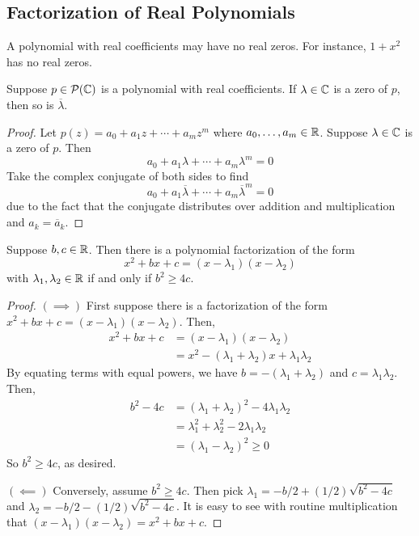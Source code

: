 \subsection*{Factorization of Real Polynomials}
A polynomial with real coefficients may have no real zeros. For instance, $1+x^2$ has no real zeros.
\begin{theorem}
    Suppose $p\in\mathcal{P}(\mathbb{C})$ is a polynomial with real coefficients. If $\lambda\in\mathbb{C}$ is a zero of $p$, then so is $\overline\lambda$.
\end{theorem}
\begin{proof}
    Let $p(z) = a_0 + a_1z + \cdots + a_mz^m$ where $a_0, \dots, a_m \in \mathbb{R}$. Suppose $\lambda\in\mathbb{C}$ is a zero of $p$. Then
    \[ a_0+a_1\lambda + \cdots + a_m\lambda^m = 0 \]
    Take the complex conjugate of both sides to find
    \[ a_0 + a_1\overline \lambda + \cdots + a_m\overline \lambda^m = 0\]
    due to the fact that the conjugate distributes over addition and multiplication and $a_k = \overline a_k$.
\end{proof}
\begin{theorem}
    Suppose $b,c\in\mathbb{R}$. Then there is a polynomial factorization of the form
    \[ x^2+bx+c = (x-\lambda_1)(x-\lambda_2) \]
    with $\lambda_1,\lambda_2\in\mathbb{R}$ if and only if $b^2 \ge 4c$.
\end{theorem}
\begin{proof}
    $(\implies)$ First suppose there is a factorization of the form $x^2+bx+c = (x-\lambda_1)(x-\lambda_2)$. Then,
    \begin{align*}
        x^2+bx + c &= (x-\lambda_1)(x-\lambda_2) \\
        &= x^2 - (\lambda_1+\lambda_2)x + \lambda_1\lambda_2
    \end{align*}
    By equating terms with equal powers, we have $b = -(\lambda_1+\lambda_2)$ and $c= \lambda_1\lambda_2$. Then,
    \begin{align*}
        b^2-4c &= (\lambda_1+\lambda_2)^2 - 4\lambda_1\lambda_2 \\
        &= \lambda_1^2 + \lambda_2^2 - 2\lambda_1\lambda_2 \\
        &= (\lambda_1 - \lambda_2)^2 \ge 0
    \end{align*}
    So $b^2 \ge 4c$, as desired.

    $(\impliedby)$ Conversely, assume $b^2 \ge 4c$. Then pick $\lambda_1 = -b/2 + (1/2)\sqrt{b^2-4c}$ and $\lambda_2 = -b/2 - (1/2)\sqrt{b^2-4c}$. It is easy to see with routine multiplication that $(x-\lambda_1)(x-\lambda_2) = x^2+bx+c$.
\end{proof}
